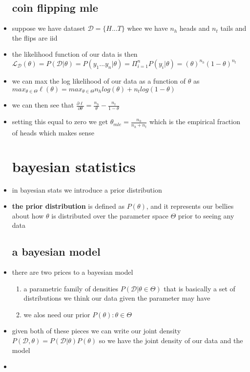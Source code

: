 \documentclass{article}
\begin{document}
\begin{itemize}
\subsection{coin flipping mle}
\item suppose we have dataset $\mathcal{D}=\{H...T\}$ whee we have $n_h$ heads and $n_t $ tails and the flips are iid
\item the likelihood function of our data is then $\mathcal{L}_{\mathcal{D}}(\theta)=P(\mathcal{D}|\theta)=P(y_1...y_n|\theta)
=\Pi_{i=1}^{n}P(y_i|\theta)=(\theta)^{n_h}(1-\theta)^{n_t}$
\item we can max the log likelihood of our data as a function of $\theta$ as $max_{\theta\in \Theta}\ell(\theta)=max_{\theta\in \Theta} n_hlog(\theta)+n_tlog(1-\theta)$
\item we can then see that $\frac{\partial \ell}{\partial \theta}=\frac{n_h}{\theta}-\frac{n_t}{1-\theta}$
\item setting this equal to zero we get $\theta_{mle}=\frac{n_h}{n_h+n_t}$ which is the empirical fraction of heads which makes sense 
\section*{bayesian statistics}
\item in bayesian stats we introduce a prior distribution
\item \textbf{the prior distribution} is defined as $P(\theta)$, and it represents our bellies about how $\theta$ is distributed over the parameter space $\Theta$ prior to seeing any data 
\subsection*{a bayesian model}
\item there are two prices to a bayesian model
\begin{enumerate}
    \item a parametric family of densities $P(\mathcal{D}|\theta\in \Theta)$ that is basically a set of distributions we think our data given the parameter may have 
    \item we alos need our prior $P(\theta):\theta\in \Theta$
    
\end{enumerate}
\item given both of these pieces we can write our joint density $P(\mathcal{D}, \theta)=P(\mathcal{D}|\theta)P(\theta)$ so we have the joint density of our data and the model
\item 

\end{itemize}
\end{document}
